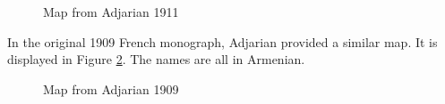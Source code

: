 \begin{figure}[H]
	\caption{Map from Adjarian 1911}
\label{map:Adjarian1911}
\end{figure}




In the original 1909 French monograph, Adjarian provided a similar map. It   is displayed in Figure \ref{map:Adjarian1909}. The names are all in Armenian. 

\begin{figure}[H]
	\caption{Map from Adjarian 1909}
	\label{map:Adjarian1909}
\end{figure}

